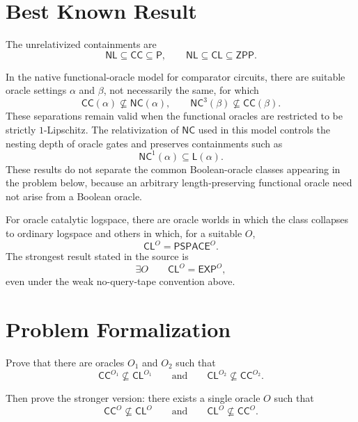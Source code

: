 \documentclass[10pt,a4paper]{article}
\theoremstyle{definition}
\begin{document}
\section{Best Known Result}

The unrelativized containments are
\begin{equation}
  \mathsf{NL}\subseteq\mathsf{CC}\subseteq\mathsf P,
  \qquad
  \mathsf{NL}\subseteq\mathsf{CL}\subseteq\mathsf{ZPP}.
\end{equation}

In the native functional-oracle model for comparator circuits, there are
suitable oracle settings $\alpha$ and $\beta$, not necessarily the same, for
which
\begin{equation}
  \mathsf{CC}(\alpha)\not\subseteq\mathsf{NC}(\alpha),
  \qquad
  \mathsf{NC}^3(\beta)\not\subseteq\mathsf{CC}(\beta).
\end{equation}
These separations remain valid when the functional oracles are restricted to
be strictly $1$-Lipschitz. The relativization of $\mathsf{NC}$ used in this
model controls the nesting depth of oracle gates and preserves containments
such as
\begin{equation}
  \mathsf{NC}^1(\alpha)\subseteq\mathsf L(\alpha).
\end{equation}
These results do not separate the common Boolean-oracle classes appearing in
the problem below, because an arbitrary length-preserving functional oracle
need not arise from a Boolean oracle.

For oracle catalytic logspace, there are oracle worlds in which the class
collapses to ordinary logspace and others in which, for a suitable $O$,
\begin{equation}
  \mathsf{CL}^O=\mathsf{PSPACE}^O.
\end{equation}
The strongest result stated in the source is
\begin{equation}
  \exists O\qquad \mathsf{CL}^O=\mathsf{EXP}^O,
\end{equation}
even under the weak no-query-tape convention above.

\section{Problem Formalization}

Prove that there are oracles $O_1$ and $O_2$ such that
\begin{equation}
  \mathsf{CC}^{O_1}\not\subseteq\mathsf{CL}^{O_1}
  \qquad\text{and}\qquad
  \mathsf{CL}^{O_2}\not\subseteq\mathsf{CC}^{O_2}.
\end{equation}

Then prove the stronger version: there exists a single oracle $O$ such that
\begin{equation}
  \mathsf{CC}^{O}\not\subseteq\mathsf{CL}^{O}
  \qquad\text{and}\qquad
  \mathsf{CL}^{O}\not\subseteq\mathsf{CC}^{O}.
\end{equation}
\end{document}
